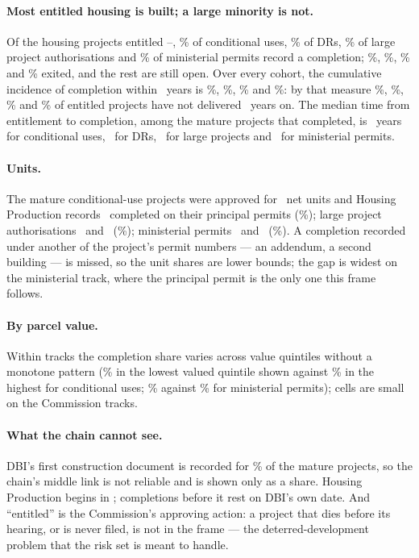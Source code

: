 \documentclass[11pt]{article}
\begin{document}
\paragraph{Most entitled housing is built; a large minority is not.} Of the housing
projects entitled \ocMatureFrom--\ocMatureTo, \ocDoneCu\% of conditional uses, \ocDoneDr\% of
DRs, \ocDoneLpa\% of large project authorisations and \ocDoneMin\% of ministerial permits record
a completion; \ocExitCu\%, \ocExitDr\%, \ocExitLpa\% and \ocExitMin\% exited, and the rest are
still open. Over every cohort, the cumulative incidence of completion within \ocYears\ years is
\ocCifCu\%, \ocCifDr\%, \ocCifLpa\% and \ocCifMin\%: by that measure \ocNeverCu\%, \ocNeverDr\%,
\ocNeverLpa\% and \ocNeverMin\% of entitled projects have not delivered \ocYears\ years on. The median
time from entitlement to completion, among the mature projects that completed, is \ocMedYearsCu\
years for conditional uses, \ocMedYearsDr\ for DRs, \ocMedYearsLpa\ for large projects and
\ocMedYearsMin\ for ministerial permits.

\paragraph{Units.} The mature conditional-use projects were approved for \ocUnitsApprCu\ net
units and Housing Production records \ocUnitsHpCu\ completed on their principal permits
(\ocUnitsShareCu\%); large project authorisations \ocUnitsApprLpa\ and \ocUnitsHpLpa\
(\ocUnitsShareLpa\%); ministerial permits \ocUnitsApprMin\ and \ocUnitsHpMin\ (\ocUnitsShareMin\%).
A completion recorded under another of the project's permit numbers --- an addendum, a second
building --- is missed, so the unit shares are lower bounds; the gap is widest on the ministerial
track, where the principal permit is the only one this frame follows.

\paragraph{By parcel value.} Within tracks the completion share varies across value quintiles
without a monotone pattern (\ocDoneLoCu\% in the lowest valued quintile shown against
\ocDoneHiCu\% in the highest for conditional uses; \ocDoneLoMin\% against \ocDoneHiMin\% for
ministerial permits); cells are small on the Commission tracks.

\paragraph{What the chain cannot see.} DBI's first construction document is recorded for
\ocFcdCover\% of the mature projects, so the chain's middle link is not reliable and is shown only
as a share. Housing Production begins in \ocMatureFrom; completions before it rest on DBI's own
date. And ``entitled'' is the Commission's approving action: a project that dies before its
hearing, or is never filed, is not in the frame --- the deterred-development problem that the
risk set is meant to handle.
\end{document}
